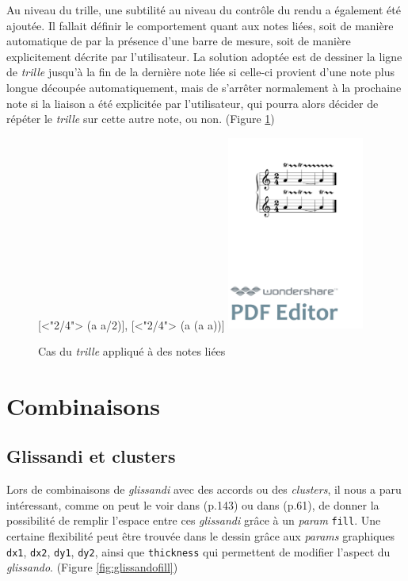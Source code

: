 \documentclass{article}
\newenvironment{gmncode}	{\vspace{-2mm}\small\verbatim}{\endverbatim\vspace{-2mm}}
\newcommand{\code}[1]		{{\small \texttt{#1}}}
\begin{document}
Au niveau du trille, une subtilité au niveau du contr\^ole du rendu a également été ajoutée. Il fallait définir le comportement quant aux notes liées, soit de manière automatique de par la présence d'une barre de mesure, soit de manière explicitement décrite par l'utilisateur. La solution adoptée est de dessiner la ligne de \emph{trille} jusqu'à la fin de la dernière note liée si celle-ci provient d'une note plus longue découpée automatiquement, mais de s'arrêter normalement à la prochaine note si la liaison a été explicitée par l'utilisateur, qui pourra alors décider de répéter le \emph{trille} sur cette autre note, ou non. (Figure \ref{fig:trill})

\begin{figure}[h]
\centering
\begin{gmncode}
{
  [\meter<"2/4"> \trill({a} {a/2})],
  [\meter<"2/4"> \trill({a} \tie({a} {a}))]
}
\end{gmncode}
\includegraphics[width=45mm]{img/trill.pdf}
\caption{Cas du \emph{trille} appliqué à des notes liées}
\label{fig:trill}
\end{figure}

\section{Combinaisons}\label{sec:combinaisons}

\subsection{Glissandi et clusters}\label{subsec:glissandiCluster}

Lors de combinaisons de \emph{glissandi}  avec des accords ou des \emph{clusters}, il nous a paru intéressant, comme on peut le voir dans \cite{gould2011behind} (p.143) ou dans \cite{stone1980music} (p.61), de donner la possibilité de remplir l'espace entre ces \emph{glissandi} grâce à un \emph{param} \code{fill}. Une certaine flexibilité peut être trouvée dans le dessin grâce aux \emph{params} graphiques \code{dx1}, \code{dx2}, \code{dy1}, \code{dy2}, ainsi que \code{thickness} qui permettent de modifier l'aspect du \emph{glissando}. (Figure \ref{fig:glissandofill})
\end{document}
